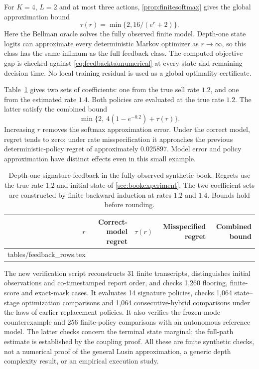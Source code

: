 \documentclass[11pt]{article}
\makeatletter
\numberwithin{equation}{section}
\theoremstyle{definition}
\theoremstyle{remark}
\theoremstyle{definition}
\newcommand{\inputtable}[1]{\@@input#1 }
\makeatother
\begin{document}
For $K=4$, $L=2$ and at most three actions,
\cref{prop:finitesoftmax} gives the global approximation bound
\begin{equation}\label{eq:feedbacktaunumerical}
 \tau(r)=\min\{2,16/(e^r+2)\}.
\end{equation}
Here the Bellman oracle solves the fully observed finite model. Depth-one
state logits can approximate every deterministic Markov optimizer as
$r\to\infty$, so this class has the same infimum as the full feedback
class. The computed objective gap is checked against \eqref{eq:feedbacktaunumerical}
at every state and remaining decision time. No local training residual is
used as a global optimality certificate.

Table~\ref{tab:feedback} gives two sets of coefficients: one from the true
sell rate $1.2$, and one from the estimated rate $1.4$. Both policies are
evaluated at the true rate $1.2$. The latter satisfy the combined bound
\[
 \min\{2,\ 4(1-e^{-0.2})+\tau(r)\}.
\]
Increasing $r$ removes the softmax approximation error. Under the correct
model, regret tends to zero; under rate misspecification it approaches the
previous deterministic-policy regret of approximately $0.025897$.
Model error and policy approximation have distinct effects even in this
small example.

\begin{table}[tb]
\centering\small
\caption{Depth-one signature feedback in the fully observed synthetic book.
Regrets use the true rate $1.2$ and initial state of \cref{sec:bookexperiment}.
The two coefficient sets are constructed by finite backward induction at
rates $1.2$ and $1.4$. Bounds hold before rounding.}
\label{tab:feedback}
\begin{tabular}{rrrrr}
\toprule
$r$ & Correct-model regret & $\tau(r)$ & Misspecified regret & Combined bound\\
\midrule
\inputtable{tables/feedback_rows.tex}
\bottomrule
\end{tabular}
\end{table}

The new verification script reconstructs 31 finite transcripts, distinguishes
initial observations and co-timestamped report order, and checks 1,260
flooring, finite-score and exact-mask cases. It evaluates 14 signature
policies, checks 1,064 state--stage optimization comparisons and 1,064
consecutive-hybrid comparisons under the laws of earlier replacement
policies. It also verifies the frozen-mode counterexample and 256
finite-policy comparisons with an autonomous reference model. The latter
checks concern the terminal state marginal; the full-path estimate is
established by the coupling proof. All these are finite synthetic checks,
not a numerical proof of the general Lusin approximation, a generic depth
complexity result, or an empirical execution study.
\end{document}
